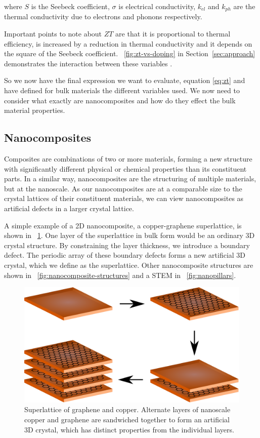 \documentclass[12pt]{article}
\newcommand{\figref}[2][\figurename~]{#1\ref{#2}}
\newcommand{\secref}[2][Section~]{#1\ref{#2}}
\begin{document}
where $S$ is the Seebeck coefficient, $\sigma$ is electrical conductivity, $k_{el}$ and $k_{ph}$ are the thermal conductivity due to electrons and phonons respectively.

Important points to note about $ZT$ are that it is proportional to thermal efficiency, is increased by a reduction in thermal conductivity and it depends on the square of the Seebeck coefficient. \figref{fig:zt-vs-doping} in \secref{sec:approach} demonstrates the interaction between these variables .

So we now have the final expression we want to evaluate, equation \eqref{eq:zt} and have defined for bulk materials the different variables used. We now need to consider what exactly are nanocomposites and how do they effect the bulk material properties.

\subsection{Nanocomposites}
Composites are combinations of two or more materials, forming a new structure with significantly different physical or chemical properties than its constituent parts. In a similar way, nanocomposites are the structuring of multiple materials, but at the nanoscale. As our nanocomposites are at a comparable size to the crystal lattices of their constituent materials, we can view nanocomposites as artificial defects in a larger crystal lattice.

A simple example of a 2D nanocomposite, a copper-graphene superlattice, is shown in \figref{fig:superlattice}. One layer of the superlattice in bulk form would be an ordinary 3D crystal structure. By constraining the layer thickness, we introduce a boundary defect. The periodic array of these boundary defects forms a new artificial 3D crystal, which we define as the superlattice. Other nanocomposite structures are shown in \figref{fig:nanocomposite-structures} and a STEM in \figref{fig:nanopillars}.

\begin{figure}
	\centering
	\includegraphics[width=\textwidth]{graphene-superlattice.eps}
	\caption{Superlattice of graphene and copper. Alternate layers of nanoscale copper and graphene are sandwiched together to form an artificial 3D crystal, which has distinct properties from the individual layers.}
	\label{fig:superlattice}
\end{figure}
\end{document}
